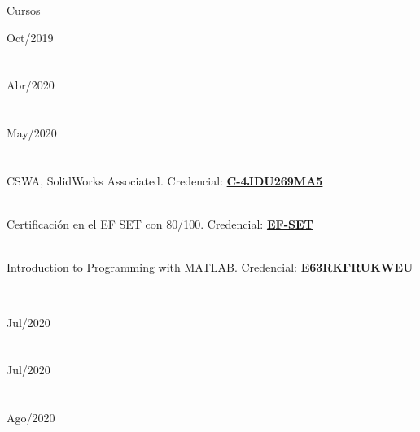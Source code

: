 \documentclass[10pt]{article}
\begin{document}
\begin{LARGE}
        \color{blue!50!black} Cursos\par
\end{LARGE}
    
\begin{multicols}{2}
    \begin{vwcol}[widths={0.235,0.765},
 sep=.8cm,rule=0pt,indent=0em,lines=9]
        \hspace{5pt}Oct/2019\\
        \hfill\\
        \hfill\\
        \hspace{5pt}Abr/2020\\
        \hfill\\
        \hfill\\
        \hspace{5pt}May/2020\\
        \hfill\\
        \hfill\\
        CSWA, SolidWorks Associated. Credencial: \href{https://cv.virtualtester.com/qr/?b=SLDWRKS&i=C-4JDU269MA5}{\textbf{C-4JDU269MA5}}\par\hfill\\
        Certificación en el EF SET con 80/100. Credencial: \href{https://www.efset.org/cert/oZC3oZ}{\textbf{EF-SET}}\par\hfill\\
        Introduction to Programming with MATLAB. Credencial: \href{https://www.coursera.org/account/accomplishments/verify/E63RKFRUKWEU}{\textbf{E63RKFRUKWEU}}\par\hfill\\
    \end{vwcol}
    \columnbreak
    \begin{vwcol}[widths={0.235,0.765}, sep=.8cm,rule=0pt,indent=0em,lines=9]
        \hspace{5pt}Jul/2020\\
        \hfill\\
        \hfill\\
        \hspace{5pt}Jul/2020\\
        \hfill\\
        \hfill\\
        \hspace{5pt}Ago/2020\\
        \hfill\\
        \hfill\\

\end{vwcol}
\end{multicols}
\end{document}
